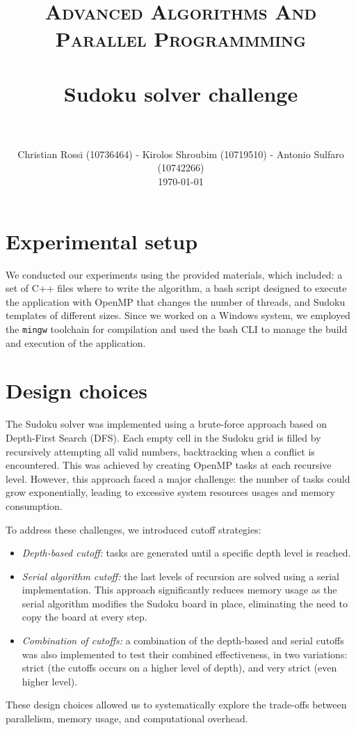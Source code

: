 \documentclass[paper=a4, fontsize=12pt]{scrartcl}
\title{
		\vspace{-1in} 	
		\usefont{OT1}{bch}{b}{n}
		\normalfont \normalsize \textsc{Advanced Algorithms And Parallel Programmming} \\ [25pt]
		\horrule{0.5pt} \\[0.4cm]
		\huge Sudoku solver challenge \\
		\horrule{2pt} \\[0.5cm]
}
\author{
		\normalfont 								\normalsize
        Christian Rossi (10736464) - Kirolos Shroubim (10719510) - Antonio Sulfaro (10742266)\\[-3pt]		\normalsize
        \today
}
\date{}
\numberwithin{equation}{section}
\numberwithin{figure}{section}
\numberwithin{table}{section}
\begin{document}
    \maketitle

    \section{Experimental setup}
    We conducted our experiments using the provided materials, which included: a set of C++ files where to write the algorithm, a bash script designed to execute the application with OpenMP that changes the number of threads, and Sudoku templates of different sizes. 
    Since we worked on a Windows system, we employed the \texttt{mingw} toolchain for compilation and used the bash CLI to manage the build and execution of the application.
    
    \section{Design choices}
    The Sudoku solver was implemented using a brute-force approach based on Depth-First Search (DFS). 
    Each empty cell in the Sudoku grid is filled by recursively attempting all valid numbers, backtracking when a conflict is encountered.
    This was achieved by creating OpenMP tasks at each recursive level. 
    However, this approach faced a major challenge: the number of tasks could grow exponentially, leading to excessive system resources usages and memory consumption.

    \noindent To address these challenges, we introduced cutoff strategies:
    \begin{itemize}
        \item \textit{Depth-based cutoff:} tasks are generated until a specific depth level is reached. 
        \item \textit{Serial algorithm cutoff:} the last levels of recursion are solved using a serial implementation. 
            This approach significantly reduces memory usage as the serial algorithm modifies the Sudoku board in place, eliminating the need to copy the board at every step.
        \item \textit{Combination of cutoffs:} a combination of the depth-based and serial cutoffs was also implemented to test their combined effectiveness, in two variations: strict (the cutoffs occurs on a higher level of depth), and very strict (even higher level).
    \end{itemize}
    These design choices allowed us to systematically explore the trade-offs between parallelism, memory usage, and computational overhead. 
\end{document}
